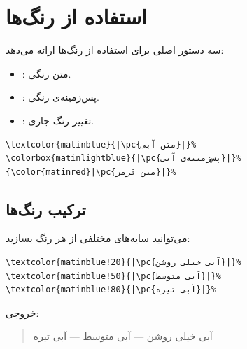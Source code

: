 
\section{استفاده از رنگ‌ها}
\label{sec:colors-usage}

 سه دستور اصلی برای استفاده
از رنگ‌ها ارائه می‌دهد:

\begin{itemize}
    \item {}:
    متن رنگی.
    \item {}:
    پس‌زمینه‌ی رنگی.
    \item {}: تغییر رنگ جاری.
\end{itemize}

\begin{latin}
\begin{verbatim}
\textcolor{matinblue}{|\pc{متن آبی}|}%
\colorbox{matinlightblue}{|\pc{پس‌زمینه‌ی آبی}|}%
{\color{matinred}|\pc{متن قرمز}|}%
\end{verbatim}
\end{latin}


\subsection{ترکیب رنگ‌ها}
\label{sec:colors-mixing}

می‌توانید سایه‌های مختلفی از هر رنگ بسازید:

\begin{latin}
\begin{verbatim}
\textcolor{matinblue!20}{|\pc{آبی خیلی روشن}|}%
\textcolor{matinblue!50}{|\pc{آبی متوسط}|}%
\textcolor{matinblue!80}{|\pc{آبی تیره}|}%
\end{verbatim}
\end{latin}

خروجی:

\begin{quote}
    \textcolor{matinblue!20}{آبی خیلی روشن} —
    \textcolor{matinblue!50}{آبی متوسط} —
    \textcolor{matinblue!80}{آبی تیره}
\end{quote}


